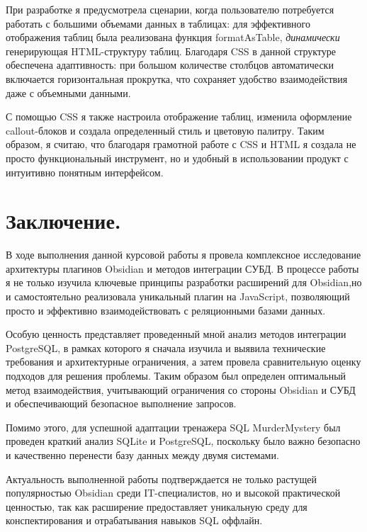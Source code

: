 \documentclass[14pt]{extarticle}
\begin{document}
	При разработке я предусмотрела сценарии, когда пользователю потребуется работать с большими объемами данных в таблицах: для эффективного отображения таблиц была реализована функция formatAsTable, \textit{динамически} генерирующая HTML-структуру таблиц. Благодаря CSS в данной структуре обеспечена адаптивность: при большом количестве столбцов автоматически включается горизонтальная прокрутка, что сохраняет удобство взаимодействия даже с объемными данными.
	
	С помощью CSS я также настроила отображение таблиц, изменила оформление callout-блоков и создала определенный стиль и цветовую палитру. Таким образом, я считаю, что благодаря грамотной работе с CSS и HTML я создала не просто функциональный инструмент, но и удобный в
	использовании продукт с интуитивно понятным интерфейсом.
	
	
	\newpage
	\section{Заключение.}
	
	В ходе выполнения данной курсовой работы я провела комплексное исследование архитектуры плагинов Obsidian и методов интеграции СУБД. В процессе работы я не только изучила ключевые принципы разработки расширений для Obsidian,но и самостоятельно реализовала уникальный плагин на JavaScript, позволяющий просто и эффективно взаимодействовать с реляционными базами данных. 
	
	Особую ценность представляет проведенный мной анализ методов интеграции PostgreSQL, в рамках которого я сначала изучила и выявила технические требования и архитектурные ограничения, а затем провела сравнительную оценку подходов для решения проблемы. Таким образом был определен оптимальный метод взаимодействия, учитывающий ограничения со стороны Obsidian и СУБД и обеспечивающий безопасное выполнение запросов. 
	
	Помимо этого, для успешной адаптации тренажера SQL MurderMystery был проведен краткий анализ SQLite и PostgreSQL, поскольку было важно безопасно и качественно перенести базу данных между двумя системами. 
	
	Актуальность выполненной работы подтверждается не только растущей популярностью
	Obsidian среди IT-специалистов, но и высокой практической ценностью, так как расширение предоставляет уникальную среду для конспектирования и отрабатывания навыков SQL оффлайн.
	
\end{document}
